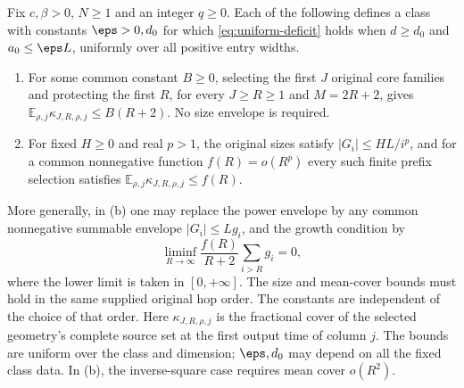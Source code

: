 \begin{corollary}\label{cor:uniform-cover}
Fix $c,\beta>0$, $N\ge1$ and an integer $q\ge0$.
Each of the following defines a class with constants $\eps>0,d_0$ for
which \cref{eq:uniform-deficit} holds when $d\ge d_0$ and
$a_0\le\eps L$, uniformly over all positive entry widths.
\begin{enumerate}[label=(\alph*)]
\item For some common constant $B\ge0$, selecting the first $J$
original core families and protecting the first $R$, for every
$J\ge R\ge1$ and $M=2R+2$, gives
$\mathbb E_{\rho,j}\kappa_{J,R,\rho,j}\le B(R+2)$.
No size envelope is required.
\item For fixed $H\ge0$ and real $p>1$, the original sizes satisfy
$|G_i|\le HL/i^p$, and for a common nonnegative function
$f(R)=o(R^p)$ every such finite prefix selection satisfies
$\mathbb E_{\rho,j}\kappa_{J,R,\rho,j}\le f(R)$.
\end{enumerate}
More generally, in (b) one may replace the power envelope by any common
nonnegative summable envelope $|G_i|\le Lg_i$, and the growth condition by
\begin{equation}\label{eq:cover-tail-test}
 \liminf_{R\to\infty}
 \frac{f(R)}{R+2}\sum_{i>R}g_i=0,
\end{equation}
where the lower limit is taken in $[0,+\infty]$.
The size and mean-cover bounds must hold in the same supplied original
hop order. The constants are independent of the choice of that order.
Here $\kappa_{J,R,\rho,j}$ is the fractional cover of the selected
geometry's complete source set at the first output time of column $j$.
The bounds are uniform over the class and dimension; $\eps,d_0$ may
depend on all the fixed class data. In (b), the
inverse-square case requires mean cover $o(R^2)$.
\end{corollary}
